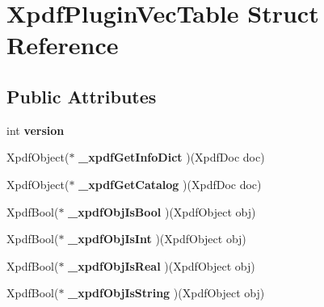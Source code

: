 \hypertarget{struct_xpdf_plugin_vec_table}{}\section{Xpdf\+Plugin\+Vec\+Table Struct Reference}
\label{struct_xpdf_plugin_vec_table}
\subsection*{Public Attributes}
\begin{DoxyCompactItemize}
\item 
\mbox{\label{struct_xpdf_plugin_vec_table_a2f33645f25513c9fe75bdbe3ac4d340a}} 
int {\bfseries version}
\item 
\mbox{\label{struct_xpdf_plugin_vec_table_a6a0e8ed63592ff20ab3b1deb65de57df}} 
Xpdf\+Object($\ast$ {\bfseries \+\_\+xpdf\+Get\+Info\+Dict} )(Xpdf\+Doc doc)
\item 
\mbox{\label{struct_xpdf_plugin_vec_table_a6667bda24eee65a66d095b1f41b36772}} 
Xpdf\+Object($\ast$ {\bfseries \+\_\+xpdf\+Get\+Catalog} )(Xpdf\+Doc doc)
\item 
\mbox{\label{struct_xpdf_plugin_vec_table_a35f82ab0bd5d2f963840b23a59a40b86}} 
Xpdf\+Bool($\ast$ {\bfseries \+\_\+xpdf\+Obj\+Is\+Bool} )(Xpdf\+Object obj)
\item 
\mbox{\label{struct_xpdf_plugin_vec_table_a7408fa126422a745004bb42be1cf0111}} 
Xpdf\+Bool($\ast$ {\bfseries \+\_\+xpdf\+Obj\+Is\+Int} )(Xpdf\+Object obj)
\item 
\mbox{\label{struct_xpdf_plugin_vec_table_a0cdc1907b0195ddff49830c20bf8c25c}} 
Xpdf\+Bool($\ast$ {\bfseries \+\_\+xpdf\+Obj\+Is\+Real} )(Xpdf\+Object obj)
\item 
\mbox{\label{struct_xpdf_plugin_vec_table_abe409ce01d660d512afdda231b364adf}} 
Xpdf\+Bool($\ast$ {\bfseries \+\_\+xpdf\+Obj\+Is\+String} )(Xpdf\+Object obj)
\item 
\mbox{\label{struct_xpdf_plugin_vec_table_af9caaffa0da4c39e86db82ac1005b559}} 

\end{DoxyCompactItemize}

